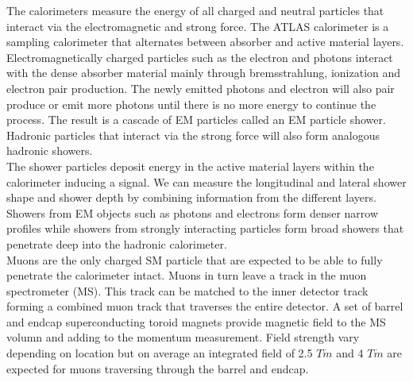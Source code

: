\indent The calorimeters measure the energy of all charged and neutral particles that interact via the electromagnetic and strong force.   The ATLAS calorimeter is a sampling calorimeter that alternates between absorber and active material layers.   Electromagnetically charged particles such as the electron and photons interact with the dense absorber material mainly through bremsstrahlung, ionization and electron pair production.  The newly emitted photons and electron will also pair produce or emit more photons until there is no more energy to continue the process.  The result is a cascade of EM particles called an EM particle shower.  Hadronic particles that interact via the strong force will also form analogous hadronic showers.  \\



\indent The shower particles deposit energy in the active material layers within the calorimeter inducing a signal.  We can measure the longitudinal and lateral shower shape and shower depth by combining information from the different layers. Showers from EM objects such as photons and electrons form denser narrow profiles while showers from strongly interacting particles form broad showers that penetrate deep into the hadronic calorimeter. \\

\indent Muons are the only charged SM particle that are expected to be able to fully penetrate the calorimeter intact.  Muons in turn leave a track in the muon spectrometer (MS).  This track can be matched to the inner detector track forming a combined muon track that traverses the entire detector.  A set of barrel and endcap superconducting toroid magnets provide magnetic field to the MS volumn and adding to the momentum measurement.  Field strength vary depending on location but on average an integrated field of 2.5 $T \dot m$ and 4 $T \dot m$ are expected for muons traversing through the barrel and endcap.\\


